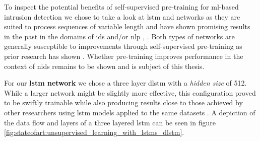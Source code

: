 To inspect the potential benefits of self-supervised pre-training for \gls{ml}-based intrusion detection we chose to take a look at \gls{lstm} and networks as they are suited to process sequences of variable length and have shown promising results in the past in the domains of \gls{ids} and/or \gls{nlp} \cite{bert}, \cite{attention_model_ids}. Both types of networks are generally susceptible to improvements through self-supervised pre-training as prior research has shown \cite{bert} \cite{unsupervised_learning_lstms} \cite{unsupervised_learning_lstms_timeseries}. Whether pre-training improves performance in the context of \gls{nids} remains to be shown and is subject of this thesis.

For our \textbf{\gls{lstm} network} we chose a three layer \gls{dlstm} with a \textit{hidden size} of 512. While a larger network might be slightly more effective, this configuration proved to be swiftly trainable while also producing results close to those achieved by other researchers using \gls{lstm} models applied to the same datasets \cite{fog_based_detection_survey_2020}. A depiction of the data flow and layers of a three layered \gls{lstm} can be seen in figure \ref{fig:stateofart:unsupervised_learning_with_lstms_dlstm}. \par

